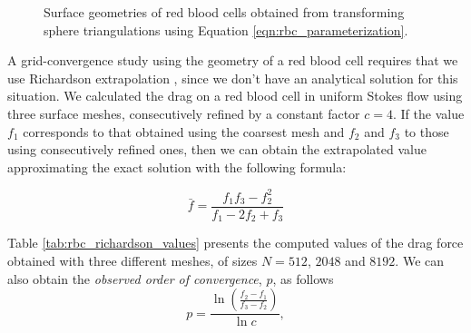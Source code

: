 \documentclass[final,3p,times]{elsarticle}
\begin{document}
\begin{figure}%
\begin{center}
	\qquad
	\caption{Surface geometries of red blood cells obtained from transforming sphere triangulations using Equation \eqref{eqn:rbc_parameterization}.}
	\label{fig:glob_rbc}
\end{center}
\end{figure}

A grid-convergence study using the geometry of a red blood cell requires that we use Richardson extrapolation \cite{roache1998}, since we don't have an analytical solution for this situation. We calculated the drag on a red blood cell in uniform Stokes flow using three surface meshes, consecutively refined by a constant factor $c=4$. 
If the value $f_1$ corresponds to that obtained using the coarsest mesh and $f_2$ and $f_3$ to those using consecutively refined ones, then we can obtain the extrapolated value approximating the exact solution with the following formula:

\begin{equation}
	\bar{f} = \frac{f_1f_3-f_2^{2}}{f_1 -2f_2+f_3}
\end{equation}

Table \ref{tab:rbc_richardson_values} presents the computed values of the drag force obtained with three different meshes, of sizes $N=512$, $2048$ and $8192$. We can also obtain the \emph{observed order of convergence}, $p$, as follows
%
\begin{equation}
	p = \frac{\ln{\left(\frac{f_2-f_1}{f_3-f_2}\right)}}{\ln{c}},
\end{equation}
\end{document}
